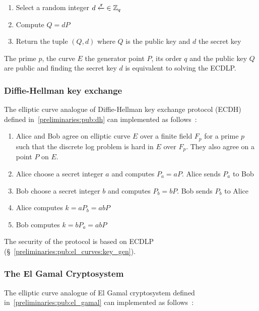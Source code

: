 \begin{enumerate}
  \item Select a random integer $d \xleftarrow{\mathtt{r}}{\in \mathbb{Z}_q}$
  \item Compute $Q = dP$
  \item Return the tuple $(Q, d)$ where $Q$ is the public key and $d$ the secret key
\end{enumerate}

The prime $p$, the curve $E$ the generator point $P$, its order $q$ and the public key $Q$ are public and finding the secret key $d$ is equivalent to solving the ECDLP.

\subsubsection{Diffie-Hellman key exchange}
\label{preliminaries:pub:el_curves:dh}

The elliptic curve analogue of Diffie-Hellman key exchange protocol (ECDH) defined in~\ref{preliminaries:pub:dh} can implemented as follows~\cite{elliptic_curves}:

\begin{enumerate}
  \item Alice and Bob agree on elliptic curve $E$ over a finite field $F_p$ for a prime $p$ such that the discrete log problem is hard in $E$ over $F_p$. They also agree on a point $P$ on $E$.
  \item Alice choose a secret integer $a$ and computes $P_a = aP$. Alice sends $P_a$ to Bob
  \item Bob choose a secret integer $b$ and computes $P_b = bP$. Bob sends $P_b$ to Alice
  \item Alice computes $k = aP_b = abP$
  \item Bob computes $k = bP_a = abP$
\end{enumerate}

The security of the protocol is based on ECDLP (§~\ref{preliminaries:pub:el_curves:key_gen}).

\subsubsection{The El Gamal Cryptosystem}
\label{preliminaries:pub:el_curves:el_gamal}

The elliptic curve analogue of El Gamal cryptosystem defined in~\ref{preliminaries:pub:el_gamal} can implemented as follows~\cite{elliptic_curves_2}:

